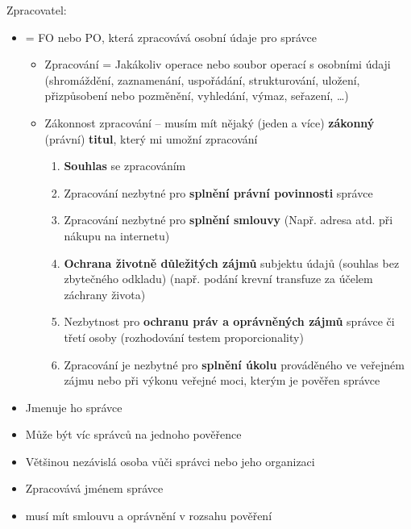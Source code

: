 \documentclass{article}
\begin{document}
Zpracovatel:
\begin{itemize}
    \item = FO nebo PO, která zpracovává osobní údaje pro správce
    \begin{itemize}
        \item Zpracování = Jakákoliv operace nebo soubor operací s osobními údaji (shromáždění, zaznamenání, uspořádání, strukturování, uložení, přizpůsobení nebo pozměnění, vyhledání, výmaz, seřazení, \dots)
        \item Zákonnost zpracování – musím mít nějaký (jeden a více) \textbf{zákonný} (právní) \textbf{titul}, který mi umožní zpracování
        \begin{enumerate}
            \item \textbf{Souhlas} se zpracováním
            \item Zpracování nezbytné pro \textbf{splnění právní povinnosti} správce
            \item Zpracování nezbytné pro \textbf{splnění smlouvy} (Např. adresa atd. při nákupu na internetu)
            \item \textbf{Ochrana životně důležitých zájmů} subjektu údajů (souhlas bez zbytečného odkladu) (např. podání krevní transfuze za účelem záchrany života)
            \item Nezbytnost pro \textbf{ochranu práv a oprávněných zájmů} správce či třetí osoby (rozhodování testem proporcionality)
            \item Zpracování je nezbytné pro \textbf{splnění úkolu} prováděného ve veřejném zájmu nebo při výkonu veřejné moci, kterým je pověřen správce
        \end{enumerate}
    \end{itemize}
    \item Jmenuje ho správce
    \item Může být víc správců na jednoho pověřence
    \item Většinou nezávislá osoba vůči správci nebo jeho organizaci
    \item Zpracovává jménem správce
    \item musí mít smlouvu a oprávnění v rozsahu pověření
\end{itemize}
\end{document}
